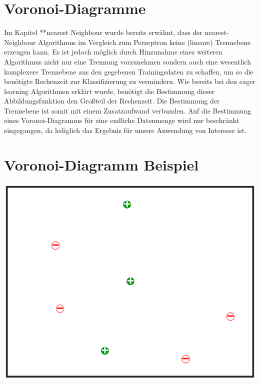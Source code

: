 \documentclass[a4paper]{scrartcl}
\begin{document}
\begin{multicols}{2}
        \section{Voronoi-Diagramme}
            Im Kapitel **nearest Neighbour wurde bereits erwähnt, dass der nearest-Neighbour Algorithmus im Vergleich zum Perzeptron keine (lineare) Trennebene erzeugen kann. Es ist jedoch möglich durch Hinzunahme eines weiteren Algorithmus nicht nur eine Trennung vorzunehmen sondern auch eine wesentlich komplexere Trennebene aus den gegebenen Trainingsdaten zu schaffen, um so die benötigte Rechenzeit zur Klassifizierung zu vermindern.
            Wie bereits bei den eager learning Algorithmen erklärt wurde, benötigt die Bestimmung dieser Abbildungsfunktion den Großteil der Rechenzeit. Die Bestimmung der Trennebene ist somit mit einem Zusatzaufwand verbunden. 
            Auf die Bestimmung eines Voronoi-Diagramms für eine endliche Datenmenge wird nur beschränkt eingegangen, da lediglich das Ergebnis für unsere Anwendung von Interesse ist.
                        
        \section{Voronoi-Diagramm Beispiel}
            \includegraphics[width=\linewidth]{vor1.png}
                        

\end{multicols}
\end{document}
